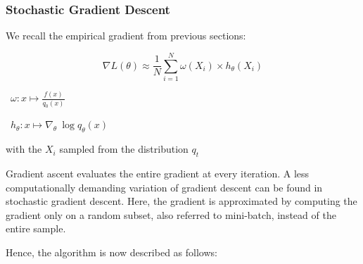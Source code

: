 \subsubsection{Stochastic Gradient Descent}
	 We recall the empirical gradient from previous sections:

	$$\nabla L(\theta) \approx \frac 1 N \displaystyle\sum_{i = 1}^N \omega(X_i) \times h_\theta(X_i)$$

	\faAngleRight \ $\omega : x \mapsto \frac{f(x)}{q_0(x)}$

	\faAngleRight \ $h_\theta : x \mapsto \nabla_\theta \ \log q_\theta(x)$

	\bigskip

	with the $X_i$ sampled from the distribution $q_{t}$

	\bigskip

	Gradient ascent evaluates the entire gradient at every iteration. A less computationally demanding variation of gradient descent can be found in stochastic gradient descent. Here, the gradient is approximated by computing the gradient only on a random subset, also referred to mini-batch, instead of the entire sample. \cite{deisenroth_faisal_ong_2020}

	\bigskip



    \columnbreak
 
    Hence, the algorithm is now described as follows:

